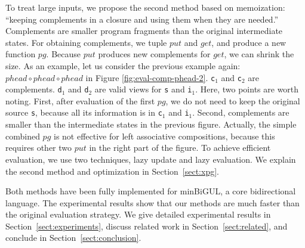 To treat large inputs, we propose the second method based on memoization: ``keeping complements in a closure and using them when they are needed.'' Complements are smaller program fragments than the original intermediate states.
%
%
For obtaining complements, we tuple $put$ and $get$, and produce a new function $pg$. Because $put$ produces new complements for $get$, we can shrink the size.
As an example, let us consider the previous example again: $phead \circ phead \circ phead$ in Figure \ref{fig:eval-comp-phead-2}. \texttt{c$_1$} and \texttt{c$_2$} are complements. \texttt{d$_1$} and \texttt{d$_2$} are valid views for \texttt{s} and \texttt{i$_1$}. Here, two points are worth noting. First, after evaluation of the first $pg$, we do not need to keep the original source \texttt{s}, because all its information is in \texttt{c$_1$} and \texttt{i$_1$}. Second, complements are smaller than the intermediate states in the previous figure.
Actually, the simple combined $pg$ is not effective for left associative compositions, because this requires other two $put$ in the right part of the figure. To achieve efficient evaluation, we use two techniques, lazy update and lazy evaluation. We explain the second method and optimization in Section~\ref{sect:xpg}.

Both methods have been fully implemented for minBiGUL, a core bidirectional language. The experimental results show that our methods are much faster than the original evaluation strategy.
We give detailed experimental results in Section~\ref{sect:experiments}, discuss related work in Section~\ref{sect:related}, and conclude in Section~\ref{sect:conclusion}.



